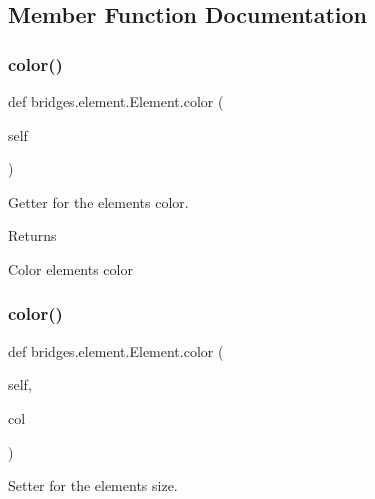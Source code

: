 \subsection{Member Function Documentation}
\mbox{\label{classbridges_1_1element_1_1_element_af8bf34079130638064db0b03ef5bb79a}} 
\subsubsection{\texorpdfstring{color()}{color()}\hspace{0.1cm}{\footnotesize\ttfamily [1/2]}}
{\footnotesize\ttfamily def bridges.\+element.\+Element.\+color (\begin{DoxyParamCaption}\item[{}]{self }\end{DoxyParamCaption})}



Getter for the element\textquotesingle{}s color. 

\begin{DoxyReturn}{Returns}


Color element\textquotesingle{}s color 
\end{DoxyReturn}
\mbox{\label{classbridges_1_1element_1_1_element_ace59b1eb4cf0d775e9afa31605183c50}} 
\subsubsection{\texorpdfstring{color()}{color()}\hspace{0.1cm}{\footnotesize\ttfamily [2/2]}}
{\footnotesize\ttfamily def bridges.\+element.\+Element.\+color (\begin{DoxyParamCaption}\item[{}]{self,  }\item[{}]{col }\end{DoxyParamCaption})}



Setter for the element\textquotesingle{}s size. 


